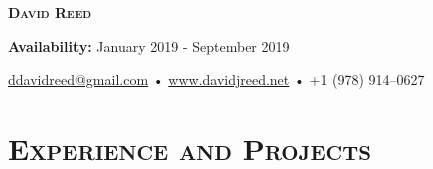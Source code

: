 \documentclass{article}
\begin{document}
\thispagestyle{empty}

\begin{center}
  {\LARGE\textsc{\textbf{David Reed}}}
\end{center}
\begin{center}
  \textbf{Availability:}
  January 2019 - September 2019
\end{center}
\begin{center}
  \href{mailto:ddavidreed@gmail.com}{ddavidreed@gmail.com} • \href{http://www.davidjreed.net/}{www.davidjreed.net} • +1 (978) 914--0627 \\
  \hrulefill
\end{center}


\section*{\textsc{Experience and Projects}}
\end{document}
